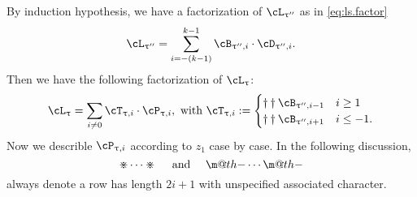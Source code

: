 \documentclass[12pt,a4paper]{amsart}
\makeatletter
\def\abs#1{\left|{#1}\right|}
\numberwithin{equation}{section}
\theoremstyle{remark}
\newcommand{\dotminus}{\mathbin{\text{\@dotminus}}}
\newcommand{\@dotminus}{%
  \ooalign{\hidewidth\raise1ex\hbox{.}\hidewidth\cr$\m@th-$\cr}%
}
\def\uptaupp{\uptau^{\prime\prime}}
\def\uum{{\dotminus}}
\def\uup{\divideontimes}
\makeatother
\begin{document}
\medskip

By induction hypothesis, we have
a factorization of $\cL_{\uptaupp}$ as in \eqref{eq:ls.factor}
\[
  \cL_{\uptaupp} = \sum_{i=-(k-1)}^{k-1}\cB_{\uptaupp,i}\cdot \cD_{\uptaupp,i}.
\]
Then we have the following factorization of $\cL_{\uptau}$:
\[
\cL_{\uptau}=\sum_{i\neq 0} \cT_{\uptau,i}\cdot \cP_{\uptau,i}, \text{ with
} \cT_{\uptau,i}:=
\begin{cases}
\dagger\dagger \cB_{\uptaupp,i-1} & i\geq 1 \\
\dagger\dagger \cB_{\uptaupp,i+1} & i\leq -1.
\end{cases}
\]
Now we describle $\cP_{\uptau,i}$ according to $z_{1}$ case by case. In the
following discussion,
\[
  \uup\cdots\uup\quad \text{ and }\quad  \uum\cdots\uum
\]
always denote a row has length
$2i+1$ with unspecified associated character.
\end{document}
